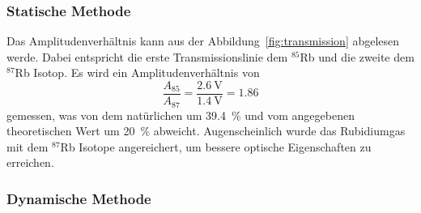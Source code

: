 \subsubsection{Statische Methode}%
\label{ssub:statisch}
Das Amplitudenverhältnis kann aus der Abbildung~\ref{fig:transmission} abgelesen werde.
Dabei entspricht die erste Transmissionslinie dem $^{85}$Rb und die zweite dem
$^{87}$Rb Isotop.
Es wird ein Amplitudenverhältnis von
\begin{equation}
	\frac{A_{85}}{A_{87}} = \frac{\SI{2.6}{\volt}}{\SI{1.4}{\volt}} = \num{1.86}
\end{equation}
gemessen, was von dem natürlichen um \SI{39.4}{\percent} und vom angegebenen
theoretischen Wert um \SI{20}{\percent} abweicht.
Augenscheinlich wurde das Rubidiumgas mit dem $^{87}$Rb Isotope angereichert,
um bessere optische Eigenschaften zu erreichen.


\subsubsection{Dynamische Methode}%
\label{ssub:dynamisch}

